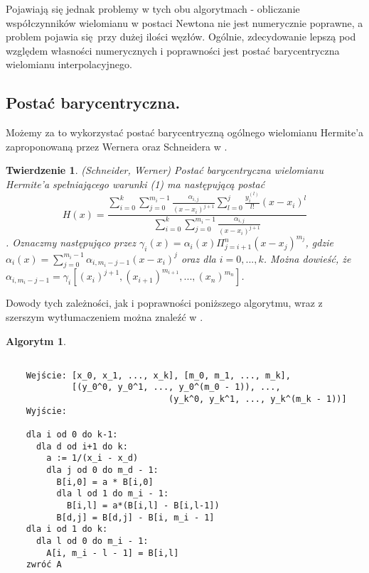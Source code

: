 \documentclass[10pt,wide]{mwart}
\newtheorem{tw}{Twierdzenie}
\theoremstyle{definition}
\newtheorem{alg}{Algorytm}
\begin{document}
Pojawiają się jednak problemy w tych obu algorytmach - obliczanie współczynników wielomianu w postaci Newtona nie jest numerycznie poprawne, a problem pojawia się przy dużej ilości węzłów.
Ogólnie, zdecydowanie lepszą pod względem własności numerycznych i poprawności jest postać barycentryczna wielomianu interpolacyjnego.
\subsection{Postać barycentryczna.}
Możemy za to wykorzystać postać barycentryczną ogólnego wielomianu Hermite'a zaproponowaną przez Wernera oraz Schneidera w \cite{CSWW}.
\begin{tw} (Schneider, Werner)
Postać barycentryczna wielomianu Hermite'a spełniającego warunki (1) ma następującą postać
\begin{equation}
  H(x) = \frac{\sum_{i=0}^{k}\sum_{j=0}^{m_i - 1}\frac{\alpha_{i,j}}{(x - x_i)^{j+1}}\sum_{l=0}^{j}\frac{y_i^{(l)}}{l!}(x-x_i)^l}{\sum_{i=0}^{k}\sum_{j=0}^{m_i - 1}\frac{\alpha_{i,j}}{(x - x_i)^{j+1}}}
\end{equation}.
Oznaczmy następująco przez \(\gamma_i(x) = \alpha_i(x)\Pi_{j=i+1}^{n}(x-x_j)^{m_j}\), gdzie \(\alpha_i(x) = \sum_{j=0}^{m_i - 1}\alpha_{i,m_i-j-1}(x-x_i)^j\)
oraz dla \(i=0,...,k\). Można dowieść, że \(\alpha_{i,m_i-j-1} = \gamma_i[(x_i)^{j+1}, (x_{i+1})^{m_{i+1}}, ..., (x_n)^{m_n}]\).
\end{tw}
Dowody tych zależności, jak i poprawności poniższego algorytmu, wraz z szerszym wytłumaczeniem można znaleźć w \cite{CSWW}.
\begin{alg}
  \begin{verbatim}

    Wejście: [x_0, x_1, ..., x_k], [m_0, m_1, ..., m_k],
             [(y_0^0, y_0^1, ..., y_0^(m_0 - 1)), ...,
                                (y_k^0, y_k^1, ..., y_k^(m_k - 1))]
    Wyjście:

    dla i od 0 do k-1:
      dla d od i+1 do k:
        a := 1/(x_i - x_d)
        dla j od 0 do m_d - 1:
          B[i,0] = a * B[i,0]
          dla l od 1 do m_i - 1:
            B[i,l] = a*(B[i,l] - B[i,l-1])
          B[d,j] = B[d,j] - B[i, m_i - 1]
    dla i od 1 do k:
      dla l od 0 do m_i - 1:
        A[i, m_i - l - 1] = B[i,l]
    zwróć A
  \end{verbatim}
\end{alg}
\end{document}
